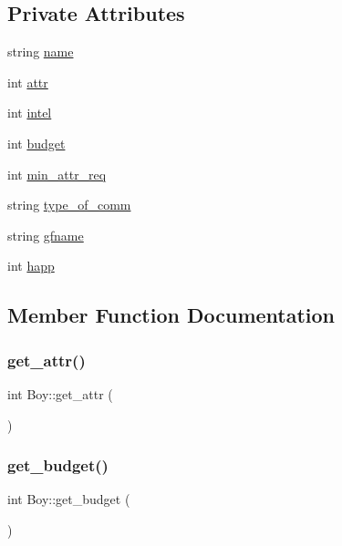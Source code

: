 \subsection*{Private Attributes}
\begin{DoxyCompactItemize}
\item 
string \hyperlink{classBoy_a8649f275f6428267fad0234866c1ccfa}{name}
\item 
int \hyperlink{classBoy_adbc26133f1d3325f5b06b48baf4af077}{attr}
\item 
int \hyperlink{classBoy_ad2389f3dd5b9566a31041caa93981b80}{intel}
\item 
int \hyperlink{classBoy_a3b755250e77f892967872c7eb4c26685}{budget}
\item 
int \hyperlink{classBoy_a3a826898118d324168a211c00bacd841}{min\+\_\+attr\+\_\+req}
\item 
string \hyperlink{classBoy_a4261d361dff9bee8b709f214e1f492dd}{type\+\_\+of\+\_\+comm}
\item 
string \hyperlink{classBoy_a2475644838835bfecbd30fa160c9d531}{gfname}
\item 
int \hyperlink{classBoy_a57e3418aa2cfad164cb58f1f5418f0f7}{happ}
\end{DoxyCompactItemize}


\subsection{Member Function Documentation}
\mbox{\label{classBoy_a37fb6a59cc1471410759526dcf2abb06}} 
\subsubsection{\texorpdfstring{get\+\_\+attr()}{get\_attr()}}
{\footnotesize\ttfamily int Boy\+::get\+\_\+attr (\begin{DoxyParamCaption}{ }\end{DoxyParamCaption})}

\mbox{\label{classBoy_a32916b400448215ba0c4ad8e1061def9}} 
\subsubsection{\texorpdfstring{get\+\_\+budget()}{get\_budget()}}
{\footnotesize\ttfamily int Boy\+::get\+\_\+budget (\begin{DoxyParamCaption}{ }\end{DoxyParamCaption})}

